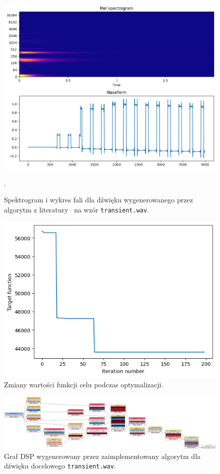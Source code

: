 \begin{figure}[H]
    \centering
    \includegraphics[width=0.7\linewidth]{rys06/macret_evolved_transient.png}
    \caption{
      Spektrogram i wykres fali dla dźwięku wygenerowanego 
      przez algorytm z literatury~\cite{evolutionary_puredata} na wzór
      \texttt{transient.wav}.
    }\label{fig:evolved_literature_transient_sound_overview}.
\end{figure}

\begin{figure}[H]
    \centering
    \includegraphics[width=0.6\linewidth]{rys06/transient_target_fun_values.png}
    \caption{
      Zmiany wartości funkcji celu podczas optymalizacji.
    }%
\end{figure}

\begin{figure}
    \centering
    \includegraphics[angle=90,width=0.35\linewidth]{rys06/evolved_graph_transient.png}
    \caption{
      Graf DSP wygenerowany przez zaimplementowany algorytm
      dla dźwięku docelowego \texttt{transient.wav}.
    }\label{fig:evolved_graph_transient}
\end{figure}



